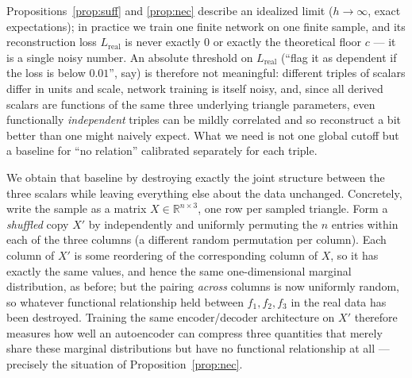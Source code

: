 \documentclass[11pt,reqno]{amsart}
\numberwithin{equation}{section}
\theoremstyle{definition}
\theoremstyle{remark}
\begin{document}
Propositions~\ref{prop:suff} and \ref{prop:nec} describe an idealized limit
($h\to\infty$, exact expectations); in practice we train one finite network
on one finite sample, and its reconstruction loss $L_{\mathrm{real}}$ is
never exactly $0$ or exactly the theoretical floor $c$ --- it is a single
noisy number. An absolute threshold on $L_{\mathrm{real}}$ (``flag it as
dependent if the loss is below $0.01$'', say) is therefore not meaningful:
different triples of scalars differ in units and scale, network training is
itself noisy, and, since all derived scalars are functions of the same
three underlying triangle parameters, even functionally \emph{independent}
triples can be mildly correlated and so reconstruct a bit better than one
might naively expect. What we need is not one global cutoff but a
baseline for ``no relation'' calibrated separately for each triple.

We obtain that baseline by destroying exactly the joint structure between
the three scalars while leaving everything else about the data unchanged.
Concretely, write the sample as a matrix $X\in\mathbb R^{n\times3}$, one row
per sampled triangle. Form a \emph{shuffled} copy $X'$ by independently and
uniformly permuting the $n$ entries within each of the three columns
(a different random permutation per column). Each column of $X'$ is some
reordering of the corresponding column of $X$, so it has exactly the same
values, and hence the same one-dimensional marginal distribution, as
before; but the pairing \emph{across} columns is now uniformly random, so
whatever functional relationship held between $f_1,f_2,f_3$ in the real
data has been destroyed. Training the same encoder/decoder architecture on
$X'$ therefore measures how well an autoencoder can compress three
quantities that merely share these marginal distributions but have no
functional relationship at all --- precisely the situation of
Proposition~\ref{prop:nec}.
\end{document}
